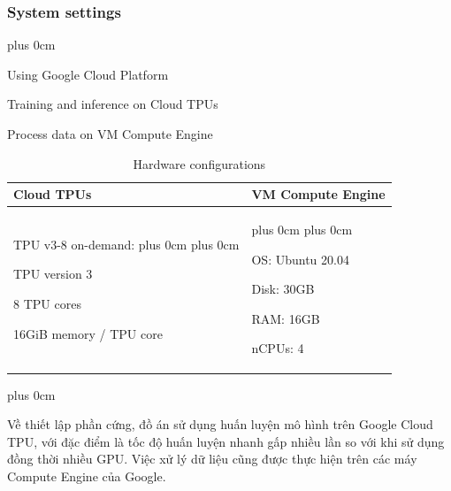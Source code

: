 \documentclass[11pt]{beamer}
\renewcommand{\raggedright}{\leftskip=0pt \rightskip=0pt plus 0cm}
\let\olditemize=\itemize
\renewenvironment{itemize}{\olditemize\raggedright}{\endlist}
\begin{document}
\begin{frame}
	\frametitle{System settings}
	\begin{adjustwidth}{-2em}{0em}
		\begin{itemize}
			\item Using Google Cloud Platform
			\item Training and inference on Cloud TPUs
			\item Process data on VM Compute Engine
		\end{itemize}
		\vspace{1cm}
		\begin{table}[!htbp]
			\centering
			\caption{Hardware configurations}
			\begin{tabular}{p{.45\linewidth}p{.45\linewidth}}
				\toprule
				Cloud TPUs & VM Compute Engine \\
				\midrule
				\begin{minipage}{6cm}
					TPU v3-8 on-demand:
					\begin{itemize}
						\item TPU version 3
						\item 8 TPU cores
						\item 16GiB memory / TPU core
					\end{itemize}
				\end{minipage} & \begin{minipage}{6cm}
					\begin{itemize}\item OS: Ubuntu 20.04  \item Disk: 30GB \item RAM: 16GB \item nCPUs: 4\end{itemize}
				\end{minipage} \\
				\bottomrule
			\end{tabular}
		\end{table}
	\end{adjustwidth}
\end{frame}
\begin{frame}
\begin{itemize}
	\item Về thiết lập phần cứng, đồ án sử dụng huấn luyện mô hình trên Google Cloud TPU, với đặc điểm là tốc độ huấn luyện nhanh gấp nhiều lần so với khi sử dụng đồng thời nhiều GPU. Việc xử lý dữ liệu cũng được thực hiện trên các máy Compute Engine của Google.
\end{itemize}
\end{frame}
\end{document}
